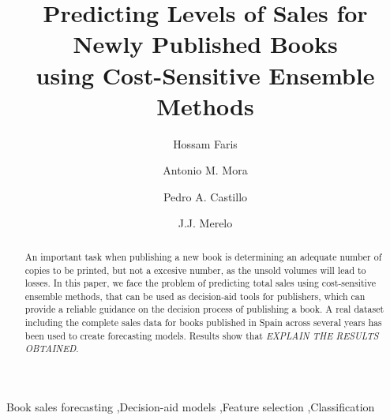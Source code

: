 \documentclass[a4paper,10pt,twocolumn,preprint,3p]{elsarticle}
\begin{document}
\begin{frontmatter}

\title{Predicting Levels of Sales for Newly Published Books \\
using Cost-Sensitive Ensemble Methods}


\author[abd]{Hossam Faris}
\author[ugrtstc]{Antonio M. Mora}
\author[ugratc]{Pedro A. Castillo}
\author[ugratc]{J.J. Merelo}


\address[abd]{Business Information Technology Department, King Abdullah II School for Information Technology \\
The University of Jordan, Amman, Jordan}
\address[ugrtstc]{Department of Signal Theory, Telematics and Communications, ETSIIT and CITIC \\
University of Granada, Granada, Spain}
\address[ugratc]{Department of Computer Architecture and Computer Technology, ETSIIT and CITIC \\
University of Granada, Granada, Spain}


\begin{abstract}

An important task when publishing a new book is determining an adequate number 
of copies to be printed, but not a excesive number, as the unsold volumes will 
lead to losses.
In this paper, we face the problem of predicting total sales using cost-sensitive
ensemble methods, that can be used as decision-aid tools for publishers, which 
can provide a reliable guidance on the decision process of publishing a book. 
A real dataset including the complete sales data for books published in Spain 
across several years has been used to create forecasting models.
Results show that \emph{EXPLAIN THE RESULTS OBTAINED}.

\end{abstract}


\begin{keyword}
Book sales forecasting \sep Decision-aid models \sep Feature selection \sep Classification  
\end{keyword}

\end{frontmatter}
\end{document}
